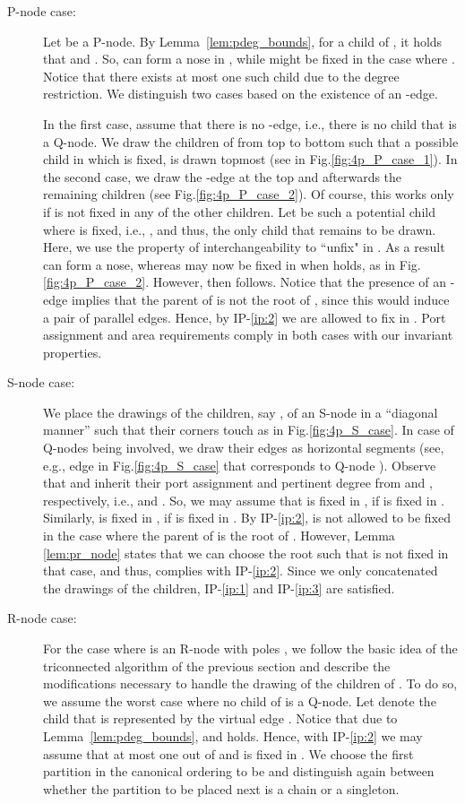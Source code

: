 \documentclass[a4paper,twoside,11pt]{article}
\newcommand{\IPGeo}{IP-\ref{ip:1}\xspace}
\newcommand{\IPFix}{IP-\ref{ip:2}\xspace}
\newcommand{\IPPort}{IP-\ref{ip:3}\xspace}
\begin{document}
\begin{description}
\item[P-node case:] Let  be a P-node. By Lemma~\ref{lem:pdeg_bounds},
for a child  of , it holds that 
and . So,  can form a nose in ,
while  might be fixed in the case where .
Notice that there exists at most one such child due to the degree
restriction. We distinguish two cases based on the existence of an
-edge.

In the first case, assume that there is no -edge, i.e., there
is no child that is a Q-node. We draw the children of  from top
to bottom such that a possible child in which  is fixed, is drawn
topmost (see  in Fig.\ref{fig:4p_P_case_1}). In the second
case, we draw the -edge at the top and afterwards the
remaining children (see Fig.\ref{fig:4p_P_case_2}). Of course, this
works only if  is not fixed in any of the other children. Let
 be such a potential child where  is fixed, i.e.,
, and thus, the only child that remains to be
drawn. Here, we use the property of interchangeability to ``unfix"
 in . As a result  can form a nose, whereas  may now
be fixed in  when  holds, as in
Fig.\ref{fig:4p_P_case_2}. However, then 
follows. Notice that the presence of an -edge implies that
the parent of  is not the root of , since this
would induce a pair of parallel edges. Hence, by \IPFix we are
allowed to fix  in . Port assignment and area requirements
comply in both cases with our invariant properties.
\item[S-node case:] We place the drawings of the children,
say , of an S-node  in a ``diagonal
manner'' such that their corners touch as in
Fig.\ref{fig:4p_S_case}. In case of Q-nodes being involved, we draw
their edges as horizontal segments (see, e.g., edge  in
Fig.\ref{fig:4p_S_case} that corresponds to Q-node ). Observe
that  and  inherit their port assignment and pertinent degree
from  and , respectively, i.e.,  and . So, we
may assume that  is fixed in , if  is fixed in .
Similarly,  is fixed in , if  is fixed in . By
\IPFix,  is not allowed to be fixed in the case where the parent
of  is the root of . However, Lemma
\ref{lem:pr_node} states that we can choose the root such that 
is not fixed in that case, and thus, complies with \IPFix. Since we
only concatenated the drawings of the children, \IPGeo and \IPPort
are satisfied.
\item[R-node case:] For the case where  is an R-node with poles
, we follow the basic idea of the
triconnected algorithm of the previous section and describe the
modifications necessary to handle the drawing of the children of
. To do so, we assume the worst case where no child of  is
a Q-node. Let  denote the child that is represented by the
virtual edge . Notice that due to
Lemma~\ref{lem:pdeg_bounds},  and
 holds. Hence, with \IPFix we may assume
that at most one out of  and  is fixed in . We
choose the first partition in the canonical ordering to be  and distinguish again between whether the partition to be
placed next is a chain or a singleton.



\end{description}
\end{document}

